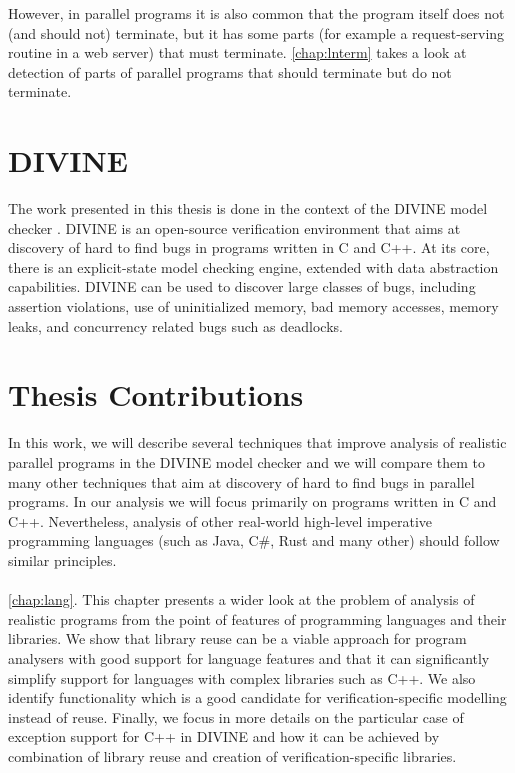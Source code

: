 However, in parallel programs it is also common that the program itself does
not (and should not) terminate, but it has some parts (for example a
request-serving routine in a web server) that must terminate.
\autoref{chap:lnterm} takes a look at detection of parts of parallel programs that should terminate but do not terminate.

\section{DIVINE}

The work presented in this thesis is done in the context of the DIVINE model checker .
DIVINE is an open-source verification environment that aims at discovery of hard to find bugs in programs written in C and C++.
At its core, there is an explicit-state model checking engine, extended with data abstraction capabilities.
DIVINE can be used to discover large classes of bugs, including assertion violations, use of uninitialized memory, bad memory accesses, memory leaks, and concurrency related bugs such as deadlocks.


\section{Thesis Contributions}

In this work, we will describe several techniques that improve analysis of realistic parallel programs in the DIVINE model checker and we will compare them to many other techniques that aim at discovery of hard to find bugs in parallel programs.
In our analysis we will focus primarily on programs written in C and C++.
Nevertheless, analysis of other real-world high-level imperative programming
languages (such as Java, C\#, Rust and many other) should follow similar
principles.

\paragraph{}
\autoref{chap:lang}.
This chapter presents a wider look at the problem of analysis of realistic
programs from the point of features of programming languages and their libraries.
We show that library reuse can be a viable approach for program analysers with
good support for language features and that it can significantly simplify
support for languages with complex libraries such as C++.
We also identify functionality which is a good candidate for
verification-specific modelling instead of reuse.
Finally, we focus in more details on the particular case of exception support
for C++ in DIVINE and how it can be achieved by combination of library reuse
and creation of verification-specific libraries.

